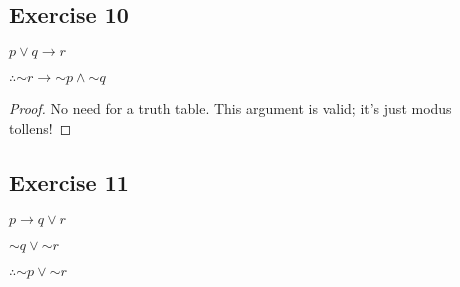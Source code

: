\documentclass[14pt]{extarticle}
\begin{document}
\subsection{Exercise 10}
$p \vee q \to r$

$\therefore {\sim r} \to {\sim p} \wedge {\sim q}$

\begin{proof}
    No need for a truth table. This argument is valid; it's just modus tollens!
\end{proof}

\subsection{Exercise 11}
$p \to q \vee r$

${\sim q} \vee {\sim r}$

$\therefore {\sim p} \vee {\sim r}$
\end{document}
